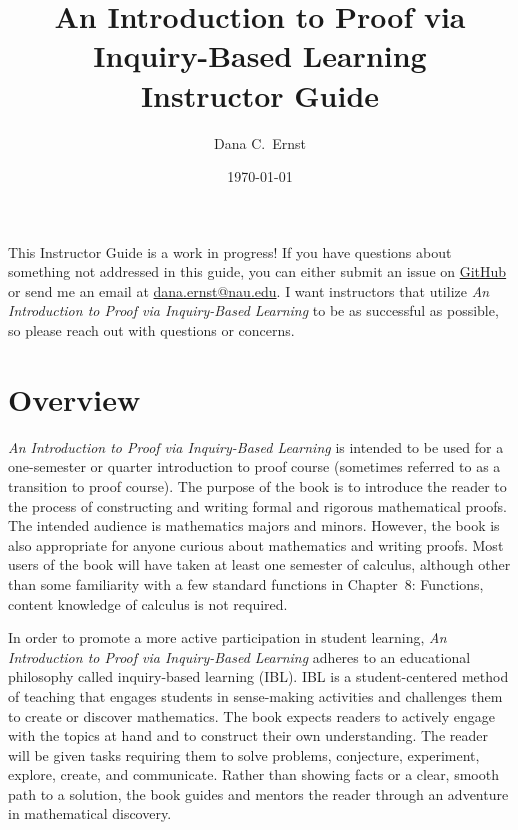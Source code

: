 \documentclass[11pt]{article}%
\newcommand{\blankline}{\pagebreak[2]\vspace{.5\baselineskip}}
\begin{document}

\title{An Introduction to Proof via Inquiry-Based Learning\\
Instructor Guide}
\author{Dana C.~Ernst}
\date{\today}

\maketitle

\begin{mdframed}[style=skeleton]
This Instructor Guide is a work in progress!  If you have questions about something not addressed in this guide, you can either submit an issue on \href{https://github.com/dcernst/IBL-IntroToProof/issues}{GitHub} or send me an email at \url{dana.ernst@nau.edu}.  I want instructors that utilize \emph{An Introduction to Proof via Inquiry-Based Learning} to be as successful as possible, so please reach out with questions or concerns.
\end{mdframed}


\section*{Overview}

\emph{An Introduction to Proof via Inquiry-Based Learning} is intended to be used for a one-semester or quarter introduction to proof course (sometimes referred to as a transition to proof course). The purpose of the book is to introduce the reader to the process of constructing and writing formal and rigorous mathematical proofs. The intended audience is mathematics majors and minors. However, the book is also appropriate for anyone curious about mathematics and writing proofs. Most users of the book will have taken at least one semester of calculus, although other than some familiarity with a few standard functions in Chapter~8: Functions, content knowledge of calculus is not required. 

\blankline

In order to promote a more active participation in student learning, \emph{An Introduction to Proof via Inquiry-Based Learning} adheres to an educational philosophy called inquiry-based learning (IBL). IBL is a student-centered method of teaching that engages students in sense-making activities and challenges them to create or discover mathematics.  The book expects readers to actively engage with the topics at hand and to construct their own understanding.  The reader will be given tasks requiring them to solve problems, conjecture, experiment, explore, create, and communicate.  Rather than showing facts or a clear, smooth path to a solution, the book guides and mentors the reader through an adventure in mathematical discovery. 
\end{document}

